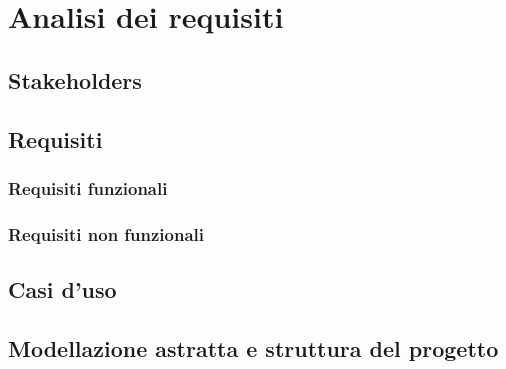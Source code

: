 \chapter{Analisi dei requisiti}
\section{Stakeholders}
\section{Requisiti}
\subsection{Requisiti funzionali}
\subsection{Requisiti non funzionali}
\section{Casi d'uso}

\section{Modellazione astratta e struttura del progetto}
